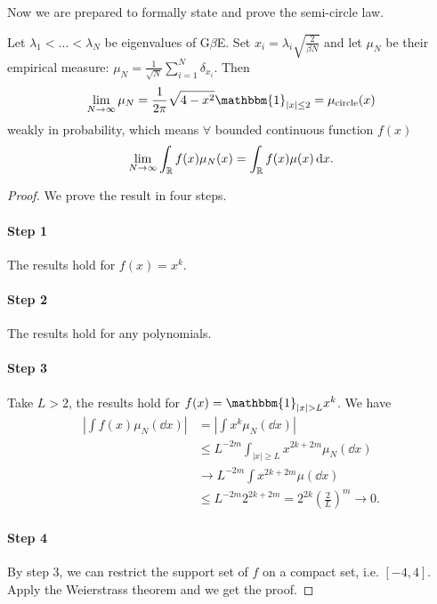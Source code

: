 Now we are prepared to formally state and prove the semi-circle law.
\begin{thm}
    Let $\lambda_1 < ... <\lambda_N$ be eigenvalues of G$\beta$E. Set $x_i = \lambda_i\sqrt{\frac{2}{\beta N}}$ and let $\mu_N$ be their empirical measure: $\mu_N = \frac{1}{\sqrt{N}}\sum_{i=1}^N \delta_{x_i}$. Then
    \[
    \lim_{N\to \infty} \mu_N = \frac{1}{2\pi} \sqrt{4-x^2} \mathbbm{1}_{|x|\le 2} = \mu_{\text{circle}}(x)
    \]
    weakly in probability, which means $\forall$ bounded continuous function $f(x)$
    \[
    \lim_{N\to \infty} \int_{\mathbb{R}} f(x)\mu_N(x) = \int_{\mathbb{R}} f(x)\mu(x) \mathop{}\!\mathrm{d} x.
    \]
\end{thm}

\begin{proof}
    We prove the result in four steps.
    \paragraph{Step 1}  The results hold for $f(x) = x^k$.
    
    \paragraph{Step 2}  The results hold for any polynomials. 
    
    \paragraph{Step 3}  Take $L>2$, the results hold for $f(x) = \mathbbm{1}_{|x|>L} x^k$.
    We have
    \begin{align*}
        \left|\int f(x)\mu_N(\dd x)\right| 
        &= \left|\int x^k\mu_N(\dd x)\right|\\
        &\le L^{-2m} \int_{|x|\ge L} x^{2k+2m}\mu_N(\dd x)\\
        &\to L^{-2m} \int x^{2k+2m} \mu(\dd x)\\
        &\le L^{-2m} 2^{2k+2m} = 2^{2k} \left(\frac{2}{L}\right)^m \to 0. 
    \end{align*}
    
    \paragraph{Step 4}  By step 3, we can restrict the support set of $f$ on a compact set, i.e. $[-4, 4]$. Apply the Weierstrass theorem and we get the proof.
\end{proof}

